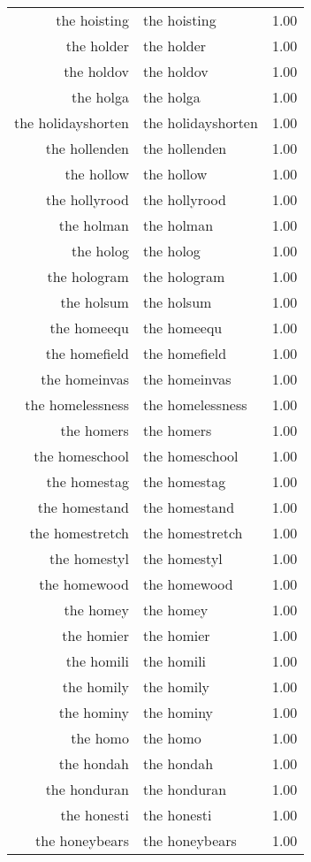 \begin{table}[ht]
\begin{tabular}{rlr}
  the hoisting & the hoisting & 1.00 \\ 
  the holder & the holder & 1.00 \\ 
  the holdov & the holdov & 1.00 \\ 
  the holga & the holga & 1.00 \\ 
  the holidayshorten & the holidayshorten & 1.00 \\ 
  the hollenden & the hollenden & 1.00 \\ 
  the hollow & the hollow & 1.00 \\ 
  the hollyrood & the hollyrood & 1.00 \\ 
  the holman & the holman & 1.00 \\ 
  the holog & the holog & 1.00 \\ 
  the hologram & the hologram & 1.00 \\ 
  the holsum & the holsum & 1.00 \\ 
  the homeequ & the homeequ & 1.00 \\ 
  the homefield & the homefield & 1.00 \\ 
  the homeinvas & the homeinvas & 1.00 \\ 
  the homelessness & the homelessness & 1.00 \\ 
  the homers & the homers & 1.00 \\ 
  the homeschool & the homeschool & 1.00 \\ 
  the homestag & the homestag & 1.00 \\ 
  the homestand & the homestand & 1.00 \\ 
  the homestretch & the homestretch & 1.00 \\ 
  the homestyl & the homestyl & 1.00 \\ 
  the homewood & the homewood & 1.00 \\ 
  the homey & the homey & 1.00 \\ 
  the homier & the homier & 1.00 \\ 
  the homili & the homili & 1.00 \\ 
  the homily & the homily & 1.00 \\ 
  the hominy & the hominy & 1.00 \\ 
  the homo & the homo & 1.00 \\ 
  the hondah & the hondah & 1.00 \\ 
  the honduran & the honduran & 1.00 \\ 
  the honesti & the honesti & 1.00 \\ 
  the honeybears & the honeybears & 1.00 \\ 

\end{tabular}
\end{table}
